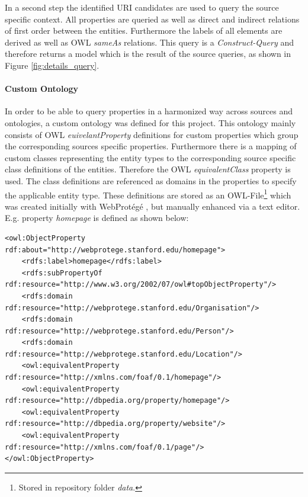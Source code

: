 In a second step the identified URI candidates are used to query the source specific context. All properties are queried as well as direct and indirect relations of first order between the entities. Furthermore the labels of all elements are derived as well as OWL \textit{sameAs} relations. 
This query is a \textit{Construct-Query} and therefore returns a model which is the result of the source queries, as shown in Figure \ref{fig:details_query}. 

\paragraph{Custom Ontology}
In order to be able to query properties in a harmonized way across sources and ontologies, a custom ontology was defined for this project. This  ontology mainly consists of OWL \textit{euivelantProperty} definitions for custom properties which group the corresponding sources specific properties. Furthermore there is a mapping of custom classes representing the entity types to the corresponding source specific class definitions of the entities. Therefore the OWL \textit{equivalentClass} property is used. The class definitions are referenced as domains in the properties to specify the applicable entity type. These definitions are stored as an OWL-File\footnote{Stored in repository folder \textit{data}.} which was created initially with WebProtégé \cite{stanford_university_webprotege_2016}, but manually enhanced via a text editor. E.g. property \textit{homepage} is defined as shown below:


\tiny
\begin{lstlisting}
<owl:ObjectProperty rdf:about="http://webprotege.stanford.edu/homepage">
	<rdfs:label>homepage</rdfs:label>
	<rdfs:subPropertyOf rdf:resource="http://www.w3.org/2002/07/owl#topObjectProperty"/>
	<rdfs:domain rdf:resource="http://webprotege.stanford.edu/Organisation"/>
	<rdfs:domain rdf:resource="http://webprotege.stanford.edu/Person"/>
	<rdfs:domain rdf:resource="http://webprotege.stanford.edu/Location"/>
	<owl:equivalentProperty rdf:resource="http://xmlns.com/foaf/0.1/homepage"/>
	<owl:equivalentProperty rdf:resource="http://dbpedia.org/property/homepage"/>
	<owl:equivalentProperty rdf:resource="http://dbpedia.org/property/website"/>
	<owl:equivalentProperty rdf:resource="http://xmlns.com/foaf/0.1/page"/>
</owl:ObjectProperty>
\end{lstlisting}
\normalsize




